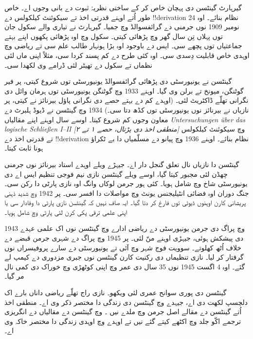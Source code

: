 \documentclass[../../../include/open-logic-section]{subfiles}
\begin{document}



گیرہارٹ گینٹسن دی پہچان خاص کر کے ساختی نظریۂ ثبوت دے بانی وجوں اے۔ خاص طور اُتے اوہنے قدرتی اخذ تے سیکوئنٹ کیلکولس دے !!{derivation} نظام بنائے۔ اوہ 24 نومبر 1909 نوں جرمنی دے گرائفسوالڈ وچ جمیا۔ گیرہارٹ نے تیاری والے سکول جان توں پہلاں تِن سال گھر وچ پڑھائی کیتی۔ سکول وچ اوہ پڑھائی پکھوں اپنے بہتے جماعتیاں توں پچھے سی۔ ایس دے باوجود اوہ بڑا ہونہار طالب علم سی تے ریاضی وچ اوہدی خاص قابلیت دِسدی سی۔ اوہ کئی طرح دے کم پسند کردا سی، مثلاً اپنی ماں لئی نظماں تے سکول دے تھیٹر لئی ڈرامے وی لکھدا سی۔

گینٹسن نے یونیورسٹی دی پڑھائی گرائفسوالڈ یونیورسٹی توں شروع کیتی، پر فیر گوٹنگن، میونخ تے برلن وی گیا۔ اوہنے 1933 وچ گوٹنگن یونیورسٹی توں ہرمان وائل دی نگرانی تھلّے ڈاکٹریٹ لئی۔ (اوہدے کم دے بہتے حصے دی نگرانی پاؤل بیرنائز نے کیتی، پر نازیاں نے بیرنائز نوں یونیورسٹی توں کڈھ دتا سی۔) 1934 وچ گینٹسن نے ڈیوڈ ہلبرٹ دے معاون وجوں کم شروع کیتا۔ اوسے سال اوہنے اپنے مقالیاں \emph{Untersuchungen \"{u}ber das logische Schlie\ss en I--II
  [منطقی اخذ دی پڑتال، حصے ۱ تے ۲]} وچ سیکوئنٹ کیلکولس تے قدرتی اخذ دے !!{derivation} نظام بنائے۔ اوہنے 1936 وچ پیانو دے مسلّمیاں دا بے ٹکراؤ ہونا ثابت کیتا۔

گینٹسن دا نازیاں نال تعلق گنجل دار اے۔ جیہڑے ویلے اوہدے استاد بیرنائز نوں جرمنی چھڈن لئی مجبور کیتا گیا، اوسے ویلے گینٹسن نازی نیم فوجی تنظیم ایس اے دی یونیورسٹی شاخ وچ شامل ہویا۔ کئی ہور جرمن لوکاں وانگ اوہ نازی پارٹی دا رکن سی۔ جنگ دوران اوہ فضائی انٹیلیجنس یونٹ وچ مواصلات دا افسر سی۔ پر 1942 وچ شدید ذہنی پریشانی کارن اوہنوں ڈیوٹی توں فارغ کر دتا گیا۔ ایہ صاف نہیں کہ گینٹسن نازی پارٹی دا وفادار سی یا اپنی علمی ترقی پکی کرن لئی پارٹی وچ شامل ہویا۔

1943 وچ پراگ دی جرمن یونیورسٹی دے ریاضی ادارے وچ گینٹسن نوں اک علمی عہدے دی پیشکش ہوئی، جیہڑی اوہنے منّ لئی۔ پر 1945 وچ پراگ دے شہری جرمن قبضے دے خلاف اُٹھ کھلوتے۔ سوویت فوج شہر وچ آئی تے یونیورسٹی دے سارے پروفیسراں نوں گرفتار کر لیا۔ نازی تنظیماں دی رکنیت کارن گینٹسن نوں جبری مزدوری دے کیمپ لے گئے۔ اوہ 4 اگست 1945 نوں 35 سال دی عمر وچ اپنی کوٹھڑی وچ خوراک دی کمی نال مر گیا۔

\begin{reading}
گینٹسن دی پوری سوانح عمری لئی \citet{Menzler-Trott2007} ویکھو۔ نازی راج تھلّے ریاضی داناں بارے اک دلچسپ لکھت \citet{Segal2014} دی اے، جیہدے وچ گینٹسن دی زندگی دا مختصر ذکر وی اے۔ منطقی اخذ اُتے گینٹسن دے مقالے اصل جرمن وچ ملدے نیں \citep{Gentzen1935a,Gentzen1935b}۔ \citet{Gentzen1969} وچ گینٹسن دے مقالیاں دے انگریزی ترجمے اکّو جلد وچ اکٹھے کیتے گئے نیں تے اوہدے وچ اوہدی زندگی دا مختصر خاکہ وی اے۔
\end{reading}
\end{document}
